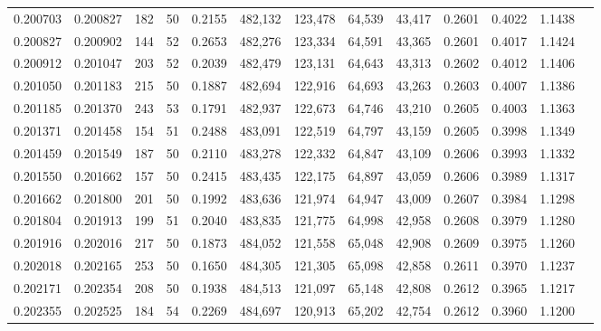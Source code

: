 \begin{tabular}{rrrrrrrrrrrrr}
0.200703 & 0.200827 &   182 &  50 &                                     0.2155 & 482,132 & 123,478 &  64,539 &  43,417 & 0.2601 & 0.4022 & 1.1438 \\
0.200827 & 0.200902 &   144 &  52 &                                     0.2653 & 482,276 & 123,334 &  64,591 &  43,365 & 0.2601 & 0.4017 & 1.1424 \\
0.200912 & 0.201047 &   203 &  52 &                                     0.2039 & 482,479 & 123,131 &  64,643 &  43,313 & 0.2602 & 0.4012 & 1.1406 \\
0.201050 & 0.201183 &   215 &  50 &                                     0.1887 & 482,694 & 122,916 &  64,693 &  43,263 & 0.2603 & 0.4007 & 1.1386 \\
0.201185 & 0.201370 &   243 &  53 &                                     0.1791 & 482,937 & 122,673 &  64,746 &  43,210 & 0.2605 & 0.4003 & 1.1363 \\
0.201371 & 0.201458 &   154 &  51 &                                     0.2488 & 483,091 & 122,519 &  64,797 &  43,159 & 0.2605 & 0.3998 & 1.1349 \\
0.201459 & 0.201549 &   187 &  50 &                                     0.2110 & 483,278 & 122,332 &  64,847 &  43,109 & 0.2606 & 0.3993 & 1.1332 \\
0.201550 & 0.201662 &   157 &  50 &                                     0.2415 & 483,435 & 122,175 &  64,897 &  43,059 & 0.2606 & 0.3989 & 1.1317 \\
0.201662 & 0.201800 &   201 &  50 &                                     0.1992 & 483,636 & 121,974 &  64,947 &  43,009 & 0.2607 & 0.3984 & 1.1298 \\
0.201804 & 0.201913 &   199 &  51 &                                     0.2040 & 483,835 & 121,775 &  64,998 &  42,958 & 0.2608 & 0.3979 & 1.1280 \\
0.201916 & 0.202016 &   217 &  50 &                                     0.1873 & 484,052 & 121,558 &  65,048 &  42,908 & 0.2609 & 0.3975 & 1.1260 \\
0.202018 & 0.202165 &   253 &  50 &                                     0.1650 & 484,305 & 121,305 &  65,098 &  42,858 & 0.2611 & 0.3970 & 1.1237 \\
0.202171 & 0.202354 &   208 &  50 &                                     0.1938 & 484,513 & 121,097 &  65,148 &  42,808 & 0.2612 & 0.3965 & 1.1217 \\
0.202355 & 0.202525 &   184 &  54 &                                     0.2269 & 484,697 & 120,913 &  65,202 &  42,754 & 0.2612 & 0.3960 & 1.1200 \\

\end{tabular}
